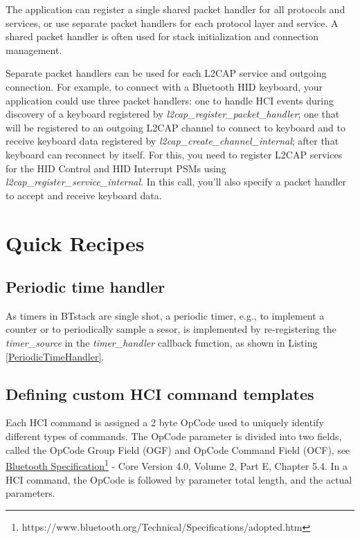 \documentclass[a4paper,titlepage,oneside,12pt]{amsart} %
\newcommand{\urlfoot}[2]{\href{#1}{{\color{blue} #2}}\footnote{#1}}
\begin{document}
The application can register a single shared packet handler for all protocols and services, or use separate packet handlers for each protocol layer and service. A shared packet handler is often used for stack initialization and connection management.

Separate packet handlers can be used for each L2CAP service and outgoing connection. For example, to connect with a Bluetooth HID keyboard, your application could use three packet handlers: one to handle HCI events during discovery of a keyboard registered by \emph{l2cap\_register\_packet\_handler}; one that will be registered to an outgoing L2CAP channel to connect to keyboard and to receive keyboard data registered by \emph{l2cap\_create\_channel\_internal}; after that keyboard can reconnect by itself. For this, you need to register L2CAP services for the HID Control and HID Interrupt PSMs using \emph{l2cap\_register\_service\_internal}. In this call, you'll also specify a packet handler to accept and receive keyboard data. 

\newcommand{\BluetoothSpecification}{\urlfoot{https://www.bluetooth.org/Technical/Specifications/adopted.htm}{Bluetooth Specification}}
\newcommand{\BluetoothSpecificationURL}{\href{https://www.bluetooth.org/Technical/Specifications/adopted.htm}{\color{blue} Bluetooth Specification}}


%

\section{Quick Recipes}

\subsection{Periodic time handler}
\label{section:periodicTimer}
As timers in BTstack are single shot, a periodic timer, e.g., to implement a counter or to periodically sample a sesor,  is implemented by re-registering the \emph{timer\_source} in the \emph{timer\_handler} callback function, as shown in  Listing \ref{PeriodicTimeHandler}.

\subsection{Defining custom HCI command templates}

Each HCI command is assigned a 2 byte OpCode used to uniquely identify different types of commands. The OpCode parameter is divided into two fields, called the OpCode Group Field (OGF) and OpCode Command Field (OCF), see \BluetoothSpecification{} - Core Version 4.0, Volume 2, Part E, Chapter 5.4. In a HCI command, the OpCode is followed by parameter total length, and the actual parameters.
\end{document}

